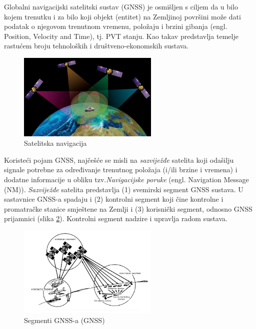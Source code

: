 \documentclass[a4paper,twoside,12pt]{memoir} %
\begin{document}
\begin{intro}
Globalni navigacijski satelitski sustav (GNSS) je osmišljen s ciljem da
u bilo kojem trenutku i za bilo koji objekt (entitet) na Zemljinoj površini može dati podatak
o njegovom trenutnom vremenu, položaju i brzini gibanja (engl. Position, Velocity and Time), tj. PVT stanju. 
Kao takav predstavlja temelje rastućem broju tehnoloških i društveno-ekonomskih sustava.
	\begin{figure}[H]
		\centering
		\includegraphics[width=0.6\textwidth]{pictureNav}
		\caption{Satelitska navigacija\cite{ref:34} }
		\label{Fig:nn}
		
	\end{figure}
	Koristeći pojam GNSS, najčešće se misli na \textit{sazviježđe}
	satelita koji odašilju signale potrebne za određivanje trenutnog položaja (i/ili brzine i vremena) i dodatne informacije u obliku tzv.\textit{Navigacijske poruke} (engl. Navigation Message (NM)).
	\textit{Sazviježđe} satelita predstavlja (1) svemirski segment GNSS sustava.
	U sastavnice GNSS-a spadaju i (2) kontrolni segment koji čine kontrolne i promatračke stanice smještene na Zemlji i (3) korisnički segment, odnosno GNSS prijamnici (slika \ref{Fig:GNSSsegmenti}).
	Kontrolni segment nadzire i upravlja radom sustava.
	
	\begin{figure}[H]
			\centering
			\includegraphics[width=0.6\textwidth]{GNSSsegmenti}
			\caption{Segmenti GNSS-a (GNSS)} %
			\label{Fig:GNSSsegmenti}
			

\end{figure}
\end{intro}
\end{document}
